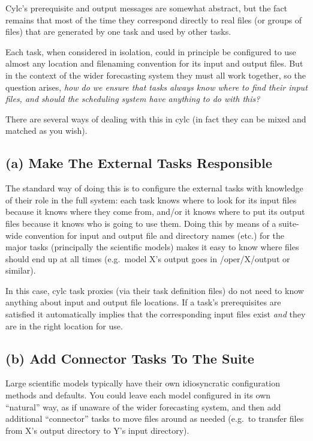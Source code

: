 \documentclass[11pt,a4paper]{article}
\begin{document}
Cylc's prerequisite and output messages are somewhat abstract, but the
fact remains that most of the time they correspond directly to real 
files (or groups of files) that are generated by one task and used by
other tasks.

Each task, when considered in isolation, could in principle be
configured to use almost any location and filenaming convention for its
input and output files. But in the context of the wider forecasting
system they must all work together, so the question arises, {\em how do
we ensure that tasks always know where to find their input files, and
should the scheduling system have anything to do with this?} 

There are several ways of dealing with this in cylc (in fact they can
be mixed and matched as you wish). 

\subsection{(a) Make The External Tasks Responsible }

The standard way of doing this is to configure the external tasks with
knowledge of their role in the full system: each task knows where to
look for its input files because it knows where they come from, and/or
it knows where to put its output files because it knows who is going to
use them. Doing this by means of a suite-wide convention for input and
output file and directory names (etc.) for the major tasks (principally
the scientific models) makes it easy to know where files should end up
at all times (e.g.\ model X's output goes in /oper/X/output or similar).

In this case, cylc task proxies (via their task definition files) do not
need to know anything about input and output file locations. If a task's
prerequisites are satisfied it automatically implies that the
corresponding input files exist {\em and} they are in the right location
for use.

\subsection{(b) Add Connector Tasks To The Suite} 

Large scientific models typically have their own idiosyncratic
configuration methods and defaults. You could leave each model
configured in its own ``natural'' way, as if unaware of the wider
forecasting system, and then add additional ``connector'' tasks to move
files around as needed (e.g.\ to transfer files from X's output
directory to Y's input directory).
\end{document}
